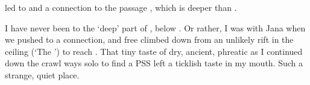 \begin{marginfigure}
\checkoddpage \ifoddpage \forcerectofloat \else \forceversofloat \fi
\centering
 \caption{ led to  and a connection to the passage , which is deeper than . }
 \label{jana sidewinder 2010}
\end{marginfigure}

I have never been to the `deep' part of , below
. Or rather, I was with Jana when we
pushed  to a connection, and free climbed down from an unlikely
rift in the ceiling (`The ') to reach . That tiny taste
of dry, ancient, phreatic as I continued down the crawl ways solo to
find a PSS left a ticklish taste in my mouth. Such a strange, quiet
place.

